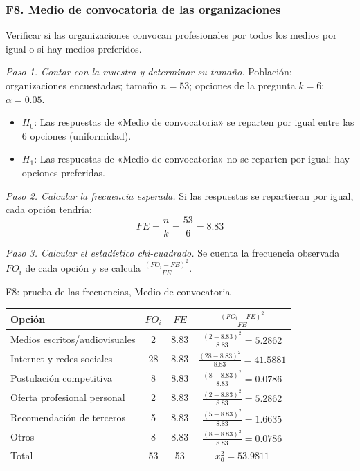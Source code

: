 \subsubsection*{F8. Medio de convocatoria de las organizaciones}

Verificar si las organizaciones convocan profesionales por todos los medios por igual o si hay medios preferidos.

\textit{Paso 1. Contar con la muestra y determinar su tamaño.} Población: organizaciones encuestadas; tamaño $n = 53$; opciones de la pregunta $k = 6$; $\alpha = 0.05$.

\begin{itemize}[nosep]
  \item $H_0$: Las respuestas de «Medio de convocatoria» se reparten por igual entre las 6 opciones (uniformidad).
  \item $H_1$: Las respuestas de «Medio de convocatoria» no se reparten por igual: hay opciones preferidas.
\end{itemize}

\textit{Paso 2. Calcular la frecuencia esperada.} Si las respuestas se repartieran por igual, cada opción tendría:
\[
FE = \frac{n}{k} = \frac{53}{6} = 8.83
\]

\textit{Paso 3. Calcular el estadístico chi-cuadrado.} Se cuenta la frecuencia observada $FO_i$ de cada opción y se calcula $\frac{(FO_i - FE)^2}{FE}$.

\begin{mitabla}{F8: prueba de las frecuencias, Medio de convocatoria}
\begin{tabular}{L{6cm}ccc}
\toprule
Opción & $FO_i$ & $FE$ & $\frac{(FO_i-FE)^2}{FE}$ \\
\midrule
Medios escritos/audiovisuales & 2 & 8.83 & $\frac{(2-8.83)^2}{8.83} = 5.2862$ \\[3pt]
Internet y redes sociales & 28 & 8.83 & $\frac{(28-8.83)^2}{8.83} = 41.5881$ \\[3pt]
Postulación competitiva & 8 & 8.83 & $\frac{(8-8.83)^2}{8.83} = 0.0786$ \\[3pt]
Oferta profesional personal & 2 & 8.83 & $\frac{(2-8.83)^2}{8.83} = 5.2862$ \\[3pt]
Recomendación de terceros & 5 & 8.83 & $\frac{(5-8.83)^2}{8.83} = 1.6635$ \\[3pt]
Otros & 8 & 8.83 & $\frac{(8-8.83)^2}{8.83} = 0.0786$ \\[3pt]
\midrule
Total & 53 & 53 & $x_0^2 = 53.9811$ \\
\bottomrule
\end{tabular}
\end{mitabla}

